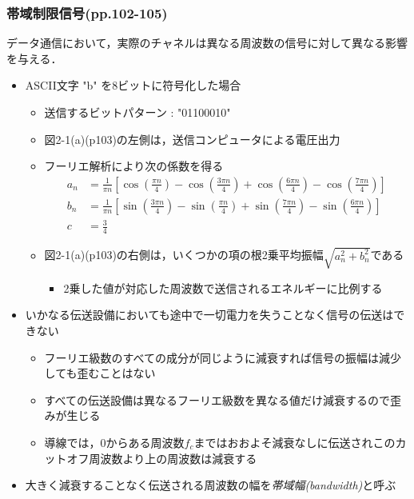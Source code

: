 \documentclass[a4paper]{ltjsarticle}
\begin{document}
		\subsubsection{帯域制限信号(pp.102-105)}
			データ通信において，実際のチャネルは異なる周波数の信号に対して異なる影響を与える．
			\begin{itemize}
				\item ASCII文字 "b" を8ビットに符号化した場合
				\begin{itemize}
					\item 送信するビットパターン : "01100010"
					\item 図2-1(a)(p103)の左側は，送信コンピュータによる電圧出力
					\item フーリエ解析により次の係数を得る
						\begin{align}
							a_n &= \frac{1}{\pi n}\left[\cos\left(\frac{\pi n}{4}\right) - \cos\left(\frac{3\pi n}{4}\right) + \cos\left( \frac{6\pi n}{4}\right) - \cos\left(\frac{7\pi n}{4} \right) \right] \\
							b_n &= \frac{1}{\pi n}\left[\sin\left(\frac{3\pi n}{4}\right) - \sin\left(\frac{\pi n}{4}\right) + \sin\left( \frac{7\pi n}{4}\right) - \sin\left(\frac{6\pi n}{4} \right) \right] \\
							c &= \frac{3}{4}
						\end{align}
					\item 図2-1(a)(p103)の右側は，いくつかの項の根2乗平均振幅$\sqrt{a^2_n + b^2_n}$である
					\begin{itemize}
						\item 2乗した値が対応した周波数で送信されるエネルギーに比例する
					\end{itemize}
				\end{itemize}
				\item いかなる伝送設備においても途中で一切電力を失うことなく信号の伝送はできない
				\begin{itemize}
					\item フーリエ級数のすべての成分が同じように減衰すれば信号の振幅は減少しても歪むことはない
					\item すべての伝送設備は異なるフーリエ級数を異なる値だけ減衰するので歪みが生じる
					\item 導線では，0からある周波数$f_c$まではおおよそ減衰なしに伝送されこのカットオフ周波数より上の周波数は減衰する
				\end{itemize}
				\item 大きく減衰することなく伝送される周波数の幅を\emph{帯域幅(bandwidth)}と呼ぶ
				\begin{itemize}

\end{itemize}
\end{itemize}
\end{document}
